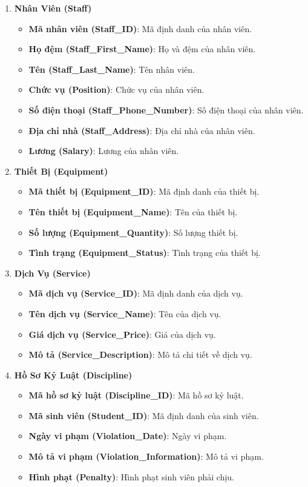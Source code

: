 \documentclass[a4paper,12pt]{article}
\begin{document}
\begin{enumerate}
    \item \textbf{Nhân Viên (Staff)}
    \begin{itemize}
        \item \textbf{Mã nhân viên (Staff\_ID)}: Mã định danh của nhân viên.
        \item \textbf{Họ đệm (Staff\_First\_Name)}: Họ và đệm của nhân viên.
        \item \textbf{Tên (Staff\_Last\_Name)}: Tên nhân viên.
        \item \textbf{Chức vụ (Position)}: Chức vụ của nhân viên.
        \item \textbf{Số điện thoại (Staff\_Phone\_Number)}: Số điện thoại của nhân viên.
        \item \textbf{Địa chỉ nhà (Staff\_Address)}: Địa chỉ nhà của nhân viên.
        \item \textbf{Lương (Salary)}: Lương của nhân viên.
    \end{itemize}
    
    \item \textbf{Thiết Bị (Equipment)}
    \begin{itemize}
        \item \textbf{Mã thiết bị (Equipment\_ID)}: Mã định danh của thiết bị.
        \item \textbf{Tên thiết bị (Equipment\_Name)}: Tên của thiết bị.
        \item \textbf{Số lượng (Equipment\_Quantity)}: Số lượng thiết bị.
        \item \textbf{Tình trạng (Equipment\_Status)}: Tình trạng của thiết bị.
    \end{itemize}
    
    \item \textbf{Dịch Vụ (Service)}
    \begin{itemize}
        \item \textbf{Mã dịch vụ (Service\_ID)}: Mã định danh của dịch vụ.
        \item \textbf{Tên dịch vụ (Service\_Name)}: Tên của dịch vụ.
        \item \textbf{Giá dịch vụ (Service\_Price)}: Giá của dịch vụ.
        \item \textbf{Mô tả (Service\_Description)}: Mô tả chi tiết về dịch vụ.
    \end{itemize}
    
    \item \textbf{Hồ Sơ Kỷ Luật (Discipline)}
    \begin{itemize}
        \item \textbf{Mã hồ sơ kỷ luật (Discipline\_ID)}: Mã hồ sơ kỷ luật.
        \item \textbf{Mã sinh viên (Student\_ID)}: Mã định danh của sinh viên.
        \item \textbf{Ngày vi phạm (Violation\_Date)}: Ngày vi phạm.
        \item \textbf{Mô tả vi phạm (Violation\_Information)}: Mô tả vi phạm.
        \item \textbf{Hình phạt (Penalty)}: Hình phạt sinh viên phải chịu.
    \end{itemize}
    

\end{enumerate}
\end{document}
